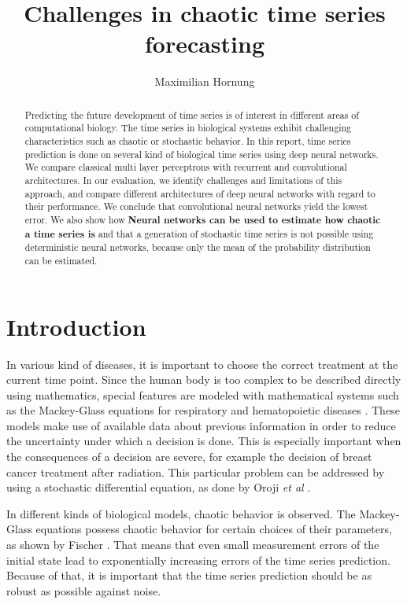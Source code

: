 \documentclass{article}
\title{Challenges in chaotic time series forecasting}
\author{Maximilian Hornung}
\begin{document}
\maketitle

\begin{abstract}
  Predicting the future development of time series is of interest in different
  areas of computational biology. The time series in biological systems exhibit
  challenging characteristics such as chaotic or stochastic behavior. In this
  report, time series prediction is done on several kind of biological time
  series using deep neural networks. We compare classical multi layer 
  perceptrons with recurrent and convolutional architectures.
  In our evaluation, we identify challenges
  and limitations of this approach, and compare different architectures of
  deep neural networks with regard to their performance. We conclude that 
  convolutional neural networks yield the lowest error. We also show how
  \textbf{Neural networks can be used to estimate how chaotic a time series is}
  and that a generation of stochastic time series is not possible using 
  deterministic neural networks, because only the mean of the probability 
  distribution can be estimated.
\end{abstract}

\section{Introduction}

In various kind of diseases, it is important to choose the correct treatment at
the current time point. Since the human body is too complex to be described
directly using mathematics, special features are modeled with mathematical
systems such as the Mackey-Glass equations for respiratory and hematopoietic
diseases \cite{mackey1977}. These models make use of available data about
previous information in order to reduce the uncertainty under which a decision
is done. This is especially important when the consequences of a decision are
severe, for example the decision of breast cancer treatment after radiation.
This particular problem can be addressed by using a stochastic differential
equation, as done by Oroji \textit{et al} \cite{oroji2016}.

In different kinds of biological models, chaotic behavior is observed. The
Mackey-Glass equations possess chaotic behavior for certain choices of their
parameters, as shown by Fischer \cite{farmer1982}. That means that even small
measurement errors of the initial state lead to exponentially increasing
errors of the time series prediction. Because of that, it is important
that the time series prediction should be as robust as possible against noise.
\end{document}
